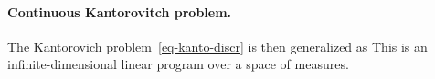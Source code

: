 %
%


\paragraph{Continuous Kantorovitch problem.}


The Kantorovich problem~\eqref{eq-kanto-discr} is then generalized as 
This is an infinite-dimensional linear program over a space of measures. 





